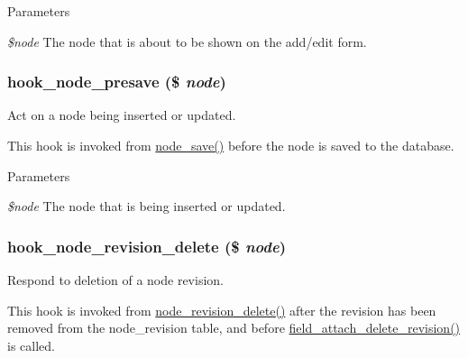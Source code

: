\begin{DoxyParams}{Parameters}
\item[{\em \$node}]The node that is about to be shown on the add/edit form. \end{DoxyParams}
\hypertarget{group__node__api__hooks_gab339b1a1ce0e235d4a9c5a05e410dcd6}{
\subsubsection[{hook\_\-node\_\-presave}]{\setlength{\rightskip}{0pt plus 5cm}hook\_\-node\_\-presave (\$ {\em node})}}
\label{group__node__api__hooks_gab339b1a1ce0e235d4a9c5a05e410dcd6}
Act on a node being inserted or updated.

This hook is invoked from \hyperlink{node_8module_a26add7591be64b30a18232927ef14faf}{node\_\-save()} before the node is saved to the database.


\begin{DoxyParams}{Parameters}
\item[{\em \$node}]The node that is being inserted or updated. \end{DoxyParams}
\hypertarget{group__node__api__hooks_gad7e8c6941181366016058771ae841bc9}{
\subsubsection[{hook\_\-node\_\-revision\_\-delete}]{\setlength{\rightskip}{0pt plus 5cm}hook\_\-node\_\-revision\_\-delete (\$ {\em node})}}
\label{group__node__api__hooks_gad7e8c6941181366016058771ae841bc9}
Respond to deletion of a node revision.

This hook is invoked from \hyperlink{node_8module_a0f00bdfa980e632ef1346027b9064b37}{node\_\-revision\_\-delete()} after the revision has been removed from the node\_\-revision table, and before \hyperlink{group__field__attach_gaa9eae65e6d9f1996cb27a55ba25b56e9}{field\_\-attach\_\-delete\_\-revision()} is called.


